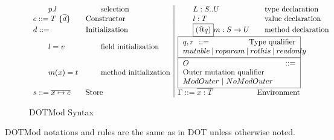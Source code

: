 \begin{figure}[htbp]
\begin{equation*}
\begin{array}{ll|ll}
		\qquad p.l & \qquad \text{selection} &
			\qquad L:S..U & \quad \text{type declaration} \\
		c::=T\ \{\overline{d}\} & \text{Constructor} &
			\qquad l:T & \quad \text{value declaration} \\
		d::= & \text{Initialization} &
			\qquad \boxed{(@q)}m:S \rightarrow U & \quad \text{method declaration} \\
		\qquad l=v & \qquad \text{field initialization} &
			\multicolumn{2}{l}{
				\fbox{
					\begin{minipage}{0.43\linewidth}
						$q,r::= \qquad \qquad \ \text{Type qualifier}$
						
						$\ \ \ \ mutable\ |\ roparam\ |\ rothis\ |\ readonly$

					\end{minipage}
				}
				} \\
		\qquad m(x)=t & \qquad \text{method initialization} &
			\multicolumn{2}{l}{
				\fbox{
					\begin{minipage}{0.43\linewidth}
						$O::= \qquad \qquad \ \ \ \text{Outer mutation qualifier}$
						
						$\ \ \ \ ModOuter\ |\ NoModOuter$

					\end{minipage}
				}
				} \\
		s::=\overline{x \mapsto c} & \text{Store} &
			\Gamma ::= \overline{x:T} & \text{Environment} \\
	\end{array}
	\end{equation*}
	\caption{DOTMod Syntax}
	\label{fig-dot-syntax}
\end{figure}


DOTMod notations and rules are the same as in DOT
unless otherwise noted.

\newpage


